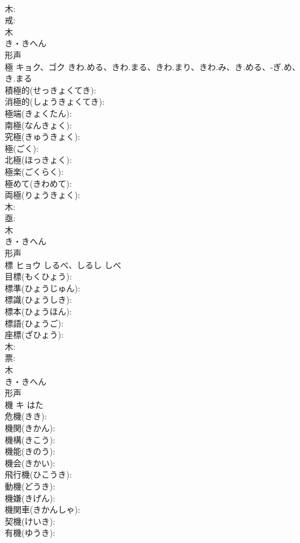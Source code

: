 \documentclass[8pt]{extreport}
\begin{document}
\begin{CJK}{UTF8}{min}
\\	木: 
\\	戒: 
\\	木	
\\	き・きへん	
\\	形声 
\\	極	キョク、ゴク	きわ.める、きわ.まる、きわ.まり、きわ.み、き.める、-ぎ.め、き.まる		
\\	積極的(せっきょくてき): 
\\	消極的(しょうきょくてき): 
\\	極端(きょくたん): 
\\	南極(なんきょく): 
\\	究極(きゅうきょく): 
\\	極(ごく): 
\\	北極(ほっきょく): 
\\	極楽(ごくらく): 
\\	極めて(きわめて): 
\\	両極(りょうきょく): 
\\	木: 
\\	亟: 
\\	木	
\\	き・きへん	
\\	形声 
\\	標	ヒョウ	しるべ、しるし	しべ	
\\	目標(もくひょう): 
\\	標準(ひょうじゅん): 
\\	標識(ひょうしき): 
\\	標本(ひょうほん): 
\\	標語(ひょうご): 
\\	座標(ざひょう): 
\\	木: 
\\	票: 
\\	木	
\\	き・きへん	
\\	形声 
\\	機	キ	はた		
\\	危機(きき): 
\\	機関(きかん): 
\\	機構(きこう): 
\\	機能(きのう): 
\\	機会(きかい): 
\\	飛行機(ひこうき): 
\\	動機(どうき): 
\\	機嫌(きげん): 
\\	機関車(きかんしゃ): 
\\	契機(けいき): 
\\	有機(ゆうき): 

\end{CJK}
\end{document}
